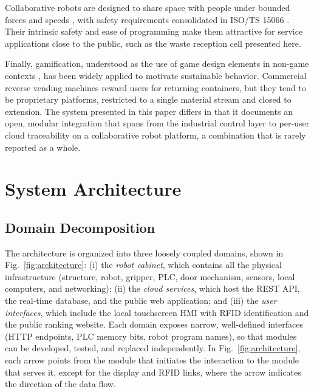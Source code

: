 \documentclass[conference]{IEEEtran}
\begin{document}
Collaborative robots are designed to share space with people under bounded forces and speeds \cite{b10}, with safety requirements consolidated in ISO/TS 15066 \cite{b11}. Their intrinsic safety and ease of programming make them attractive for service applications close to the public, such as the waste reception cell presented here.

Finally, gamification, understood as the use of game design elements in non-game contexts \cite{b12}, has been widely applied to motivate sustainable behavior. Commercial reverse vending machines reward users for returning containers, but they tend to be proprietary platforms, restricted to a single material stream and closed to extension. The system presented in this paper differs in that it documents an open, modular integration that spans from the industrial control layer to per-user cloud traceability on a collaborative robot platform, a combination that is rarely reported as a whole.

\section{System Architecture}
\subsection{Domain Decomposition}
The architecture is organized into three loosely coupled domains, shown in Fig.~\ref{fig:architecture}: (i) the \emph{robot cabinet}, which contains all the physical infrastructure (structure, robot, gripper, PLC, door mechanism, sensors, local computers, and networking); (ii) the \emph{cloud services}, which host the REST API, the real-time database, and the public web application; and (iii) the \emph{user interfaces}, which include the local touchscreen HMI with RFID identification and the public ranking website. Each domain exposes narrow, well-defined interfaces (HTTP endpoints, PLC memory bits, robot program names), so that modules can be developed, tested, and replaced independently. In Fig.~\ref{fig:architecture}, each arrow points from the module that initiates the interaction to the module that serves it, except for the display and RFID links, where the arrow indicates the direction of the data flow.
\end{document}
